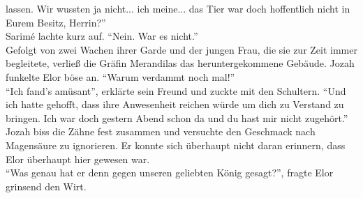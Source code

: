 lassen. Wir wussten ja nicht... ich meine... das Tier war doch hoffentlich nicht in Eurem Besitz, 
Herrin?''\\
Sarimé lachte kurz auf. ``Nein. War es nicht.''\\
Gefolgt von zwei Wachen ihrer Garde und der jungen Frau, die sie zur Zeit immer begleitete, verließ 
die Gräfin Merandilas das heruntergekommene Gebäude. Jozah funkelte Elor böse an. ``Warum verdammt 
noch mal!''\\
``Ich fand's amüsant'', erklärte sein Freund und zuckte mit den Schultern. ``Und ich hatte gehofft, 
dass ihre Anwesenheit reichen würde um dich zu Verstand zu bringen. Ich war doch gestern Abend 
schon da und du hast mir nicht zugehört.''\\
Jozah biss die Zähne fest zusammen und versuchte den Geschmack nach Magensäure zu ignorieren. Er 
konnte sich überhaupt nicht daran erinnern, dass Elor überhaupt hier gewesen war.\\
``Was genau hat er denn gegen unseren geliebten König gesagt?'', fragte Elor grinsend den Wirt.\\

